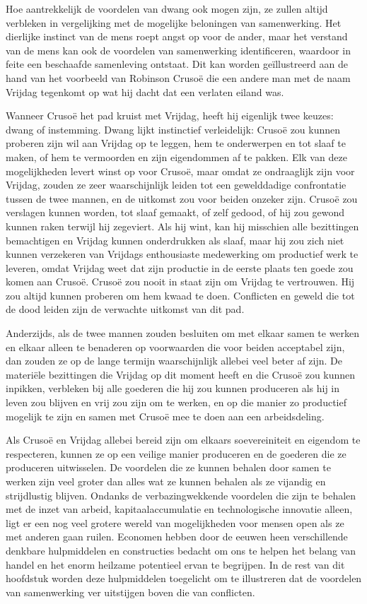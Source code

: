 \documentclass[
  a5paper,
  smalldemyvopaper,11pt,twoside,onecolumn,openright,extrafontsizes,
hidelinks]{memoir}
\begin{document}
Hoe aantrekkelijk de voordelen van dwang ook mogen zijn, ze zullen
altijd verbleken in vergelijking met de mogelijke beloningen van
samenwerking. Het dierlijke instinct van de mens roept angst op voor de
ander, maar het verstand van de mens kan ook de voordelen van
samenwerking identificeren, waardoor in feite een beschaafde samenleving
ontstaat. Dit kan worden geïllustreerd aan de hand van het voorbeeld van
Robinson Crusoë die een andere man met de naam Vrijdag tegenkomt op wat
hij dacht dat een verlaten eiland was.

Wanneer Crusoë het pad kruist met Vrijdag, heeft hij eigenlijk twee
keuzes: dwang of instemming. Dwang lijkt instinctief verleidelijk:
Crusoë zou kunnen proberen zijn wil aan Vrijdag op te leggen, hem te
onderwerpen en tot slaaf te maken, of hem te vermoorden en zijn
eigendommen af te pakken. Elk van deze mogelijkheden levert winst op
voor Crusoë, maar omdat ze ondraaglijk zijn voor Vrijdag, zouden ze zeer
waarschijnlijk leiden tot een gewelddadige confrontatie tussen de twee
mannen, en de uitkomst zou voor beiden onzeker zijn. Crusoë zou
verslagen kunnen worden, tot slaaf gemaakt, of zelf gedood, of hij zou
gewond kunnen raken terwijl hij zegeviert. Als hij wint, kan hij
misschien alle bezittingen bemachtigen en Vrijdag kunnen onderdrukken
als slaaf, maar hij zou zich niet kunnen verzekeren van Vrijdags
enthousiaste medewerking om productief werk te leveren, omdat Vrijdag
weet dat zijn productie in de eerste plaats ten goede zou komen aan
Crusoë. Crusoë zou nooit in staat zijn om Vrijdag te vertrouwen. Hij zou
altijd kunnen proberen om hem kwaad te doen. Conflicten en geweld die
tot de dood leiden zijn de verwachte uitkomst van dit pad.

Anderzijds, als de twee mannen zouden besluiten om met elkaar samen te
werken en elkaar alleen te benaderen op voorwaarden die voor beiden
acceptabel zijn, dan zouden ze op de lange termijn waarschijnlijk
allebei veel beter af zijn. De materiële bezittingen die Vrijdag op dit
moment heeft en die Crusoë zou kunnen inpikken, verbleken bij alle
goederen die hij zou kunnen produceren als hij in leven zou blijven en
vrij zou zijn om te werken, en op die manier zo productief mogelijk te
zijn en samen met Crusoë mee te doen aan een arbeidsdeling.

Als Crusoë en Vrijdag allebei bereid zijn om elkaars soevereiniteit en
eigendom te respecteren, kunnen ze op een veilige manier produceren en
de goederen die ze produceren uitwisselen. De voordelen die ze kunnen
behalen door samen te werken zijn veel groter dan alles wat ze kunnen
behalen als ze vijandig en strijdlustig blijven. Ondanks de
verbazingwekkende voordelen die zijn te behalen met de inzet van arbeid,
kapitaalaccumulatie en technologische innovatie alleen, ligt er een nog
veel grotere wereld van mogelijkheden voor mensen open als ze met
anderen gaan ruilen. Economen hebben door de eeuwen heen verschillende
denkbare hulpmiddelen en constructies bedacht om ons te helpen het
belang van handel en het enorm heilzame potentieel ervan te begrijpen.
In de rest van dit hoofdstuk worden deze hulpmiddelen toegelicht om te
illustreren dat de voordelen van samenwerking ver uitstijgen boven die
van conflicten.
\end{document}
